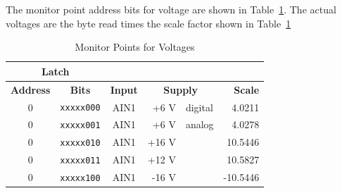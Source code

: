 \documentclass[letterpaper,11pt]{book}
\begin{document}
The monitor point address bits for voltage are shown in Table~\ref{tab:volt-mon}. 
The actual voltages are the byte read times the scale factor shown in 
Table~\ref{tab:volt-mon}
\begin{table}[h!tb]
  \begin{center}
    \caption{\label{tab:volt-mon}Monitor Points for Voltages}
    \begin{tabular}{|c|c|c|rl|r|}
    \hline
\multicolumn{2}{|c|}{\bf Latch} & \multicolumn{4}{c|}{ } \\ 
\hline  
{\bf Address} & {\bf Bits}      & {\bf Input}  & \multicolumn{2}{c|}{\bf Supply }  & {\bf Scale} \\
\hline
0       & {\tt xxxxx000}  & AIN1 &  +6 V & digital        &   4.0211 \\
0       & {\tt xxxxx001}  & AIN1 &  +6 V & analog         &   4.0278 \\
0       & {\tt xxxxx010}  & AIN1 & +16 V &                &  10.5446 \\
0       & {\tt xxxxx011}  & AIN1 & +12 V &                &  10.5827 \\
0       & {\tt xxxxx100}  & AIN1 & -16 V &                & -10.5446 \\
\hline
    \end{tabular}
  \end{center}
\end{table}
\end{document}
